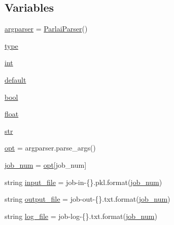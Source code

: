 \subsection*{Variables}
\begin{DoxyCompactItemize}
\item 
\hyperlink{namespacegraph__world2_1_1train_a28914dc685301ea70d35554dc0293486}{argparser} = \hyperlink{classparlai_1_1core_1_1params_1_1ParlaiParser}{Parlai\+Parser}()
\item 
\hyperlink{namespacegraph__world2_1_1train_a5483dc050b195034e046160fcc2155c5}{type}
\item 
\hyperlink{namespacegraph__world2_1_1train_ae777b30e4de8f0cdfc26bfda0c01b316}{int}
\item 
\hyperlink{namespacegraph__world2_1_1train_aa15c4b5001beb863ac4144ec68b832a9}{default}
\item 
\hyperlink{namespacegraph__world2_1_1train_adcfd197260a746eeb73a295520831582}{bool}
\item 
\hyperlink{namespacegraph__world2_1_1train_a9843eaa25215aba91f3f4b223dbb2049}{float}
\item 
\hyperlink{namespacegraph__world2_1_1train_ad6e658a468af9626e8b47490972d33a4}{str}
\item 
\hyperlink{namespacegraph__world2_1_1train_a286634b8300deedee0924d4ecac34fa6}{opt} = argparser.\+parse\+\_\+args()
\item 
\hyperlink{namespacegraph__world2_1_1train_af8a4335a70104bebca62cb53adba47f9}{job\+\_\+num} = \hyperlink{namespacegraph__world2_1_1train_a286634b8300deedee0924d4ecac34fa6}{opt}\mbox{[}\textquotesingle{}job\+\_\+num\textquotesingle{}\mbox{]}
\item 
string \hyperlink{namespacegraph__world2_1_1train_aad4143241a5ed7cfe4954939dda71b60}{input\+\_\+file} = \textquotesingle{}job-\/in-\/\{\}.pkl\textquotesingle{}.format(\hyperlink{namespacegraph__world2_1_1train_af8a4335a70104bebca62cb53adba47f9}{job\+\_\+num})
\item 
string \hyperlink{namespacegraph__world2_1_1train_a15d5a47205b2c2191cc7e40b174ee66f}{output\+\_\+file} = \textquotesingle{}job-\/out-\/\{\}.txt\textquotesingle{}.format(\hyperlink{namespacegraph__world2_1_1train_af8a4335a70104bebca62cb53adba47f9}{job\+\_\+num})
\item 
string \hyperlink{namespacegraph__world2_1_1train_a37e0c8009dd20c5ccb703af34d50a44e}{log\+\_\+file} = \textquotesingle{}job-\/log-\/\{\}.txt\textquotesingle{}.format(\hyperlink{namespacegraph__world2_1_1train_af8a4335a70104bebca62cb53adba47f9}{job\+\_\+num})

\end{DoxyCompactItemize}
